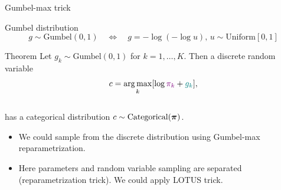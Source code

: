 \begin{frame}{Gumbel-max trick}
	\begin{block}{Gumbel distribution}		
		\vspace{-0.5cm}
		\[
			g \sim \text{Gumbel}(0, 1) \quad \Leftrightarrow \quad g = - \log (- \log u), \, u \sim \text{Uniform}[0, 1]
		\]
		\vspace{-0.8cm}
	\end{block}
	\begin{block}{Theorem}
		Let $g_k \sim \text{Gumbel}(0, 1)$ for $k = 1, \dots, K$. Then a discrete random variable
		\[
			c = \operatorname*{arg\,max}_k [\log {\color{violet}\pi_k} + {\color{teal}g_k}],
		\]
		\vspace{-0.4cm} \\
		has a categorical distribution $c \sim \text{Categorical}(\boldsymbol{\pi})$.
	\end{block}
	\begin{itemize}
		\item We could sample from the discrete distribution using Gumbel-max reparametrization.
		\item Here {\color{violet}parameters} and {\color{teal}random variable sampling} are separated (reparametrization trick). We could apply LOTUS trick.
	\end{itemize}

\end{frame}
